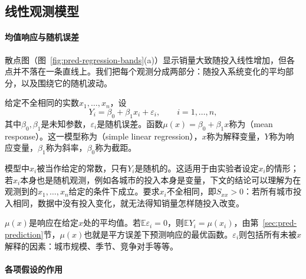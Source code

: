 \subsection{线性观测模型}

\paragraph{均值响应与随机误差}

散点图（图~\ref{fig:pred-regression-bands}(a)）显示销量大致随投入线性增加，但各点并不落在一条直线上。我们把每个观测分成两部分：随投入系统变化的平均部分，以及围绕它的随机波动。

\begin{definition}[简单线性回归模型]
\label{def:pred-simple-linear-regression}
给定不全相同的实数$x_1,\dots,x_n$，设
\[
 Y_i=\beta_0+\beta_1x_i+\varepsilon_i,\qquad i=1,\dots,n,
\]
其中$\beta_0,\beta_1$是未知参数，$\varepsilon_i$是随机误差。函数$\mu(x)=\beta_0+\beta_1x$称为（mean response）。这一模型称为（simple linear regression），$x$称为解释变量，$Y$称为响应变量，$\beta_1$称为斜率，$\beta_0$称为截距。
\end{definition}

模型中$x_i$被当作给定的常数，只有$Y_i$是随机的。这适用于由实验者设定$x_i$的情形；若$x_i$本身也是随机观测，例如各城市的投入本身是变量，下文的结论可以理解为在观测到的$x_1,\dots,x_n$给定的条件下成立。要求$x_i$不全相同，即$S_{xx}>0$：若所有城市投入相同，数据中没有投入变化，就无法得知销量怎样随投入改变。

$\mu(x)$是响应在给定$x$处的平均值。若$\mathbb E\varepsilon_i=0$，则$\mathbb EY_i=\mu(x_i)$，由第~\ref{sec:pred-prediction}节，$\mu(x)$也就是平方误差下预测响应的最优函数。$\varepsilon_i$则包括所有未被$x$解释的因素：城市规模、季节、竞争对手等等。

\paragraph{各项假设的作用}

